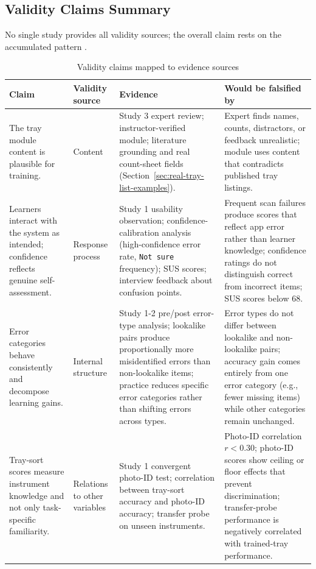 \documentclass[10pt,a4paper]{article}
\begin{document}
\subsection{Validity Claims Summary}

No single study provides all validity sources; the overall
claim rests on the accumulated pattern \cite{cook-beckman-validity-2006, kane-validity-2013}.
\begin{table}[H]
\centering
\caption{Validity claims mapped to evidence sources}
\label{tab:validity-claims-mapped-to-evidence-sources}
\small\renewcommand{\arraystretch}{1.2}\setlength{\tabcolsep}{4pt}
\begin{tabularx}{\textwidth}{|>{\raggedright\arraybackslash}X|>{\raggedright\arraybackslash}X|>{\raggedright\arraybackslash}X|>{\raggedright\arraybackslash}X|}
\hline
Claim & Validity source & Evidence & Would be falsified by \\
\hline
The tray module content is plausible for training. & Content & Study 3 expert review; instructor-verified module; literature grounding and real count-sheet fields (Section~\ref{sec:real-tray-list-examples}). & Expert finds names, counts, distractors, or feedback unrealistic; module uses content that contradicts published tray listings. \\
\hline
Learners interact with the system as intended; confidence reflects genuine self-assessment. & Response process & Study 1 usability observation; confidence-calibration analysis (high-confidence error rate, \texttt{Not sure} frequency); SUS scores; interview feedback about confusion points. & Frequent scan failures produce scores that reflect app error rather than learner knowledge; confidence ratings do not distinguish correct from incorrect items; SUS scores below 68. \\
\hline
Error categories behave consistently and decompose learning gains. & Internal structure & Study 1-2 pre/post error-type analysis; lookalike pairs produce proportionally more misidentified errors than non-lookalike items; practice reduces specific error categories rather than shifting errors across types. & Error types do not differ between lookalike and non-lookalike pairs; accuracy gain comes entirely from one error category (e.g., fewer missing items) while other categories remain unchanged. \\
\hline
Tray-sort scores measure instrument knowledge and not only task-specific familiarity. & Relations to other variables & Study 1 convergent photo-ID test; correlation between tray-sort accuracy and photo-ID accuracy; transfer probe on unseen instruments. & Photo-ID correlation $r < 0.30$; photo-ID scores show ceiling or floor effects that prevent discrimination; transfer-probe performance is negatively correlated with trained-tray performance. \\

\end{tabularx}
\end{table}
\end{document}
